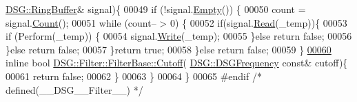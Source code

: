 \begin{DoxyCode}
      \hyperlink{class_d_s_g_1_1_ring_buffer}{DSG::RingBuffer}& signal)\{
00049             \textcolor{keywordflow}{if} (!signal.\hyperlink{class_d_s_g_1_1_ring_buffer_ac1346f5842d08b988a5297abe4089b96}{Empty}()) \{
00050                 count = signal.\hyperlink{class_d_s_g_1_1_ring_buffer_a9bd79b0a6dff618b205e396c101ee070}{Count}();
00051                 \textcolor{keywordflow}{while} (count-- > 0) \{
00052                     \textcolor{keywordflow}{if}(signal.\hyperlink{class_d_s_g_1_1_ring_buffer_a6b2848a64f15c7b0c320779582fa0fbe}{Read}(\_temp))\{
00053                         \textcolor{keywordflow}{if} (Perform(\_temp)) \{
00054                             signal.\hyperlink{class_d_s_g_1_1_ring_buffer_aa5dd2caa0a270173251faee40a43d692}{Write}(\_temp);
00055                         \}\textcolor{keywordflow}{else} \textcolor{keywordflow}{return} \textcolor{keyword}{false};
00056                     \}\textcolor{keywordflow}{else} \textcolor{keywordflow}{return} \textcolor{keyword}{false};
00057                 \}\textcolor{keywordflow}{return} \textcolor{keyword}{true};
00058             \}\textcolor{keywordflow}{else} \textcolor{keywordflow}{return} \textcolor{keyword}{false};
00059         \}
\hypertarget{_filter_8h_source_l00060}{}\hyperlink{class_d_s_g_1_1_filter_1_1_filter_base_a1bf981bd2ca2151791d91b80dda827fe}{00060}         \textcolor{keyword}{inline} \textcolor{keywordtype}{bool} \hyperlink{class_d_s_g_1_1_filter_1_1_filter_base_a1bf981bd2ca2151791d91b80dda827fe}{DSG::Filter::FilterBase::Cutoff}(
      \hyperlink{namespace_d_s_g_a4315a061386fa1014fda09b15d3a6973}{DSG::DSGFrequency} \textcolor{keyword}{const}& cutoff)\{
00061             \textcolor{keywordflow}{return} \textcolor{keyword}{false};
00062         \}
00063     \}
00064 \}
00065 \textcolor{preprocessor}{#endif }\textcolor{comment}{/* defined(\_\_DSG\_\_Filter\_\_) */}\textcolor{preprocessor}{}
\end{DoxyCode}
